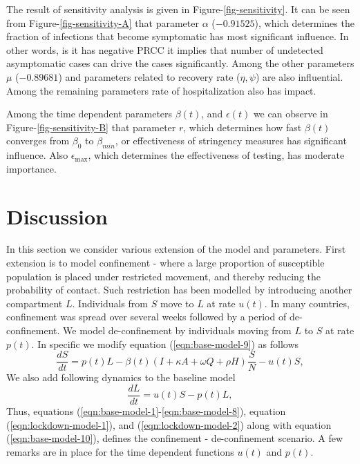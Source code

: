 \documentclass[10pt]{wlscirep}
\begin{document}
The result of sensitivity analysis is given in Figure-\ref{fig-sensitivity}. 
%
%
It can be seen from Figure-\ref{fig-sensitivity-A} that parameter $\alpha$ ($-0.91525$), which determines the fraction of infections that become symptomatic has most significant influence. In other words, is it has negative PRCC it implies  that number of undetected asymptomatic cases can drive the cases significantly. Among the other parameters $\mu$  ($-0.89681$) and parameters related to recovery rate ($\eta, \psi$) are also influential. Among the remaining parameters rate of hospitalization also has impact. 

Among the time dependent parameters $\beta(t)$, and $\epsilon(t)$ we can observe in Figure-\ref{fig-sensitivity-B} that parameter $r$, which determines how fast $\beta(t)$ converges from $\beta_0$ to $\beta_{min}$, or effectiveness of stringency measures has significant influence. Also $\epsilon_{\max}$, which determines the effectiveness of testing, has moderate importance. 

\section*{Discussion}
In this section we consider various extension of the model and parameters. First extension is to model confinement - where a large proportion of susceptible population is placed under restricted movement, and thereby reducing the probability of contact. Such restriction has been modelled by introducing another compartment $L$. Individuals from $S$ move to $L$ at rate $u(t)$. In many countries, confinement was spread over several weeks followed by a period of de-confinement. We model de-confinement by individuals moving from $L$ to $S$ at rate $p(t)$. In specific we modify equation (\ref{eqn:base-model-9}) as follows
\begin{equation}
\frac{dS}{dt} = p(t)L -\beta(t) \left( I + \kappa A + \omega Q + \rho H \right) \frac{S}{N} - u(t)S,
\label{eqn:lockdown-model-1}
\end{equation}
%
%
We also add following dynamics to the baseline model 
\begin{equation}
\frac{dL}{dt} = u(t)S - p(t)L,
\label{eqn:lockdown-model-2}
\end{equation}
Thus, equations (\ref{eqn:base-model-1}-\ref{eqn:base-model-8}), equation (\ref{eqn:lockdown-model-1}), and (\ref{eqn:lockdown-model-2}) along with equation (\ref{eqn:base-model-10}), defines the confinement - de-confinement scenario. A few remarks are in place for the time dependent functions $u(t)$ and $p(t)$.
\end{document}
